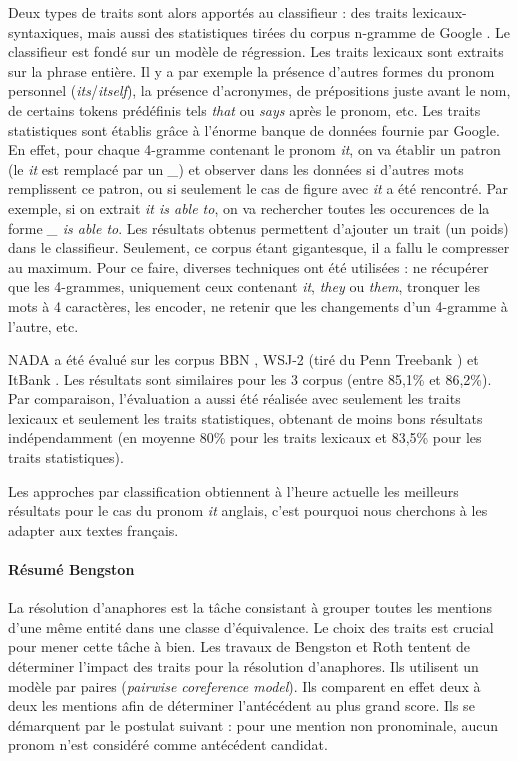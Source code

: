\documentclass[a4paper,12pt]{article}
\begin{document}
Deux types de traits sont alors apportés au classifieur : des traits lexicaux-syntaxiques, mais aussi des statistiques tirées du corpus n-gramme de Google \citep{google-ngram}. Le classifieur est fondé sur un modèle de régression. Les traits lexicaux sont extraits sur la phrase entière. Il y a par exemple la présence d'autres formes du pronom personnel (\textit{its}/\textit{itself}), la présence d'acronymes, de prépositions juste avant le nom, de certains tokens prédéfinis tels \og{}\textit{that}\fg{} ou \og{}\textit{says}\fg{} après le pronom, etc.
Les traits statistiques sont établis grâce à l'énorme banque de données fournie par Google. En effet, pour chaque 4-gramme contenant le pronom \og{}\textit{it}\fg{}, on va établir un patron (le \og{}\textit{it}\fg{} est remplacé par un \og{}\textit{\_}\fg{}) et observer dans les données si d'autres mots remplissent ce patron, ou si seulement le cas de figure avec \og{}\textit{it}\fg{} a été rencontré. Par exemple, si on extrait \og{}\textit{it is able to}\fg{}, on va rechercher toutes les occurences de la forme \og{}\textit{\_ is able to}\fg{}.
Les résultats obtenus permettent d'ajouter un trait (un poids) dans le classifieur.
Seulement, ce corpus étant gigantesque, il a fallu le compresser au maximum. Pour ce faire, diverses techniques ont été utilisées : ne récupérer que les 4-grammes, uniquement ceux contenant \og{}\textit{it}\fg{}, \og{}\textit{they}\fg{} ou \og{}\textit{them}\fg{}, tronquer les mots à 4 caractères, les encoder, ne retenir que les changements d'un 4-gramme à l'autre, etc.

NADA a été évalué sur les corpus BBN \cite{BBN}, WSJ-2 (tiré du Penn Treebank \cite{Marcus-1993-BLA-972470.972475}) et ItBank \cite{Bergsma08distributionalidentification}. Les résultats sont similaires pour les 3 corpus (entre 85,1\% et 86,2\%). Par comparaison, l'évaluation a aussi été réalisée avec seulement les traits lexicaux et seulement les traits statistiques, obtenant de moins bons résultats indépendamment (en moyenne 80\% pour les traits lexicaux et 83,5\% pour les traits statistiques).

Les approches par classification obtiennent à l'heure actuelle les meilleurs résultats pour le cas du pronom \og \textit{it} \fg{} anglais, c'est pourquoi nous cherchons à les adapter aux textes français.

\paragraph{Résumé Bengston}
La résolution d'anaphores est la tâche consistant à grouper toutes les mentions d'une même entité dans une classe d'équivalence. Le choix des traits est crucial pour mener cette tâche à bien. %
Les travaux de Bengston et Roth tentent de déterminer l'impact des traits pour la résolution d'anaphores. Ils utilisent un modèle par paires (\textit{pairwise coreference model}). Ils comparent en effet deux à deux les mentions afin de déterminer l'antécédent au plus grand score. Ils se démarquent par le postulat suivant : pour une mention non pronominale, aucun pronom n'est considéré comme antécédent candidat.
\end{document}

